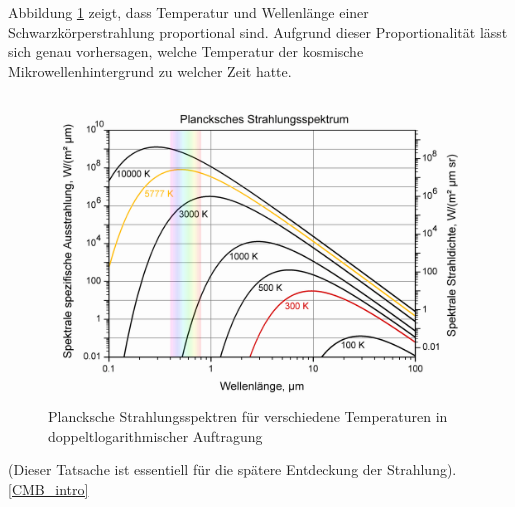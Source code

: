 Abbildung \ref{fig:blackbody_spectrum} zeigt, dass Temperatur und Wellenlänge einer Schwarzkörperstrahlung proportional sind.
Aufgrund dieser Proportionalität lässt sich genau vorhersagen, welche Temperatur der kosmische Mikrowellenhintergrund zu welcher Zeit hatte.
\begin{figure}
	\centering
	\includegraphics[width=\linewidth]{cmb/images/blackbody_spectrum.png}
	\caption{Plancksche Strahlungsspektren für verschiedene Temperaturen in doppeltlogarithmischer Auftragung}
	\label{fig:blackbody_spectrum}
\end{figure}
(Dieser Tatsache ist essentiell für die spätere Entdeckung der Strahlung).
\ref{CMB_intro}
